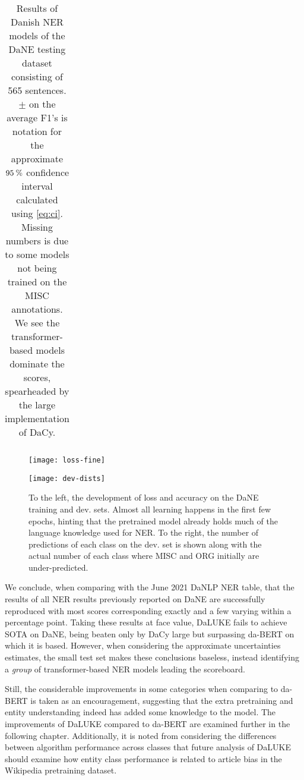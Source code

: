 \documentclass[main.tex]{subfiles}
\begin{document}
\begin{table}[H]
\begin{center}
\begin{tabular}{l l | c c c c | c c c c}
                \end{tabular}
        \end{center}
        \caption{
            Results of Danish NER models of the DaNE \cite{hvingelby2020dane} testing dataset consisting of 565 sentences.
            $\pm$ on the average F1's is notation for the approximate $95\:\text{\%{}}$ confidence interval calculated using \eqref{eq:ci}.
        Missing numbers is due to some models not being trained on the MISC annotations.
        We see the transformer-based models dominate the scores, spearheaded by the large implementation of DaCy.
        }
        \label{tab:DaNE}
\end{table}\noindent

\begin{figure}[H]
    \centering
    \begin{minipage}{.49\textwidth}
        \texttt{[image: loss-fine]}
    \end{minipage}\hfill
    \begin{minipage}{.49\textwidth}
        \texttt{[image: dev-dists]}
    \end{minipage}
    \caption{
        To the left, the development of loss and accuracy on the DaNE training and dev. sets.
        Almost all learning happens in the first few epochs, hinting that the pretrained model already holds much of the language knowledge used for NER.
        To the right, the number of predictions of each class on the dev. set is shown along with the actual number of each class where MISC and ORG initially are under-predicted.
    }
    \label{fig:main-fine-tune}
\end{figure}\noindent
We conclude, when comparing with the June 2021 DaNLP NER table\footnotemark \cite{danlp2021}, that the results of all NER results previously reported on DaNE are successfully reproduced with most  scores corresponding exactly and a few varying within a percentage point.
Taking these results at face value, DaLUKE fails to achieve SOTA on DaNE, being beaten only by DaCy large but surpassing da-BERT on which it is based.
However, when considering the approximate uncertainties estimates, the small test set makes these conclusions baseless, instead identifying a \emph{group} of transformer-based NER models leading the scoreboard.

Still, the considerable improvements in some categories when comparing to da-BERT is taken as an encouragement, suggesting that the extra pretraining and entity understanding indeed has added some knowledge to the model.
The improvements of DaLUKE compared to da-BERT are examined further in the following chapter.
Additionally, it is noted from considering the differences between algorithm performance across classes that future analysis of DaLUKE should examine how entity class performance is related to article bias in the Wikipedia pretraining dataset.
\end{document}
